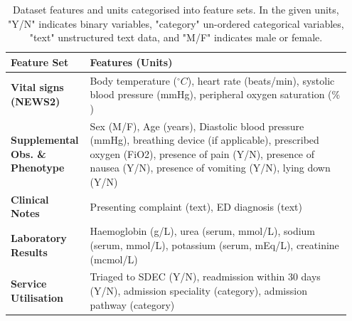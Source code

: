 \documentclass[fleqn,10pt]{wlscirep}
\begin{document}
\begin{table}[htbp]
    \centering
    \renewcommand{\arraystretch}{1.2}
    \begin{tabular}{p{0.2\linewidth} | p{0.75\linewidth}}
        \toprule
        \textbf{Feature Set}                    & \textbf{Features (Units)}                                                                                                                                                                                           \\ \midrule
        \textbf{Vital signs (NEWS2)}            & Body temperature ($^{\circ}C$), heart rate (beats/min), systolic blood pressure (mmHg), peripheral oxygen saturation ($\%$)                                                                                         \\
        \textbf{Supplemental Obs. \& Phenotype} & Sex (M/F), Age (years), Diastolic blood pressure (mmHg), breathing device (if applicable), prescribed oxygen (FiO2), presence of pain (Y/N), presence of nausea (Y/N), presence of vomiting (Y/N), lying down (Y/N) \\
        \textbf{Clinical Notes}                 & Presenting complaint (text), ED diagnosis (text)                                                                                                                                                                    \\
        \textbf{Laboratory Results}             & Haemoglobin (g/L), urea (serum, mmol/L), sodium (serum, mmol/L), potassium (serum, mEq/L), creatinine (mcmol/L)                                                                                                     \\
        \textbf{Service Utilisation}            & Triaged to SDEC (Y/N), readmission within 30 days (Y/N), admission speciality (category), admission pathway (category)                                                                                              \\
        \bottomrule
    \end{tabular}
    \caption{Dataset features and units categorised into feature sets. In the given units, "Y/N" indicates binary variables, "category" un-ordered categorical variables, "text" unstructured text data, and "M/F" indicates male or female.}
    \label{tab:feature_sets}
\end{table}
\end{document}
